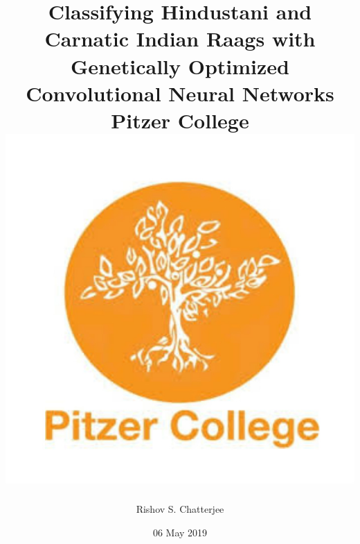 \documentclass[12pt]{report}
\title{
{Classifying Hindustani and Carnatic Indian Raags with Genetically Optimized Convolutional Neural Networks}\\
{\large Pitzer College}\\
{\includegraphics{university.jpg}}
}
\author{Rishov S. Chatterjee}
\date{06 May 2019}
\begin{document}
\maketitle{}
\end{document}
